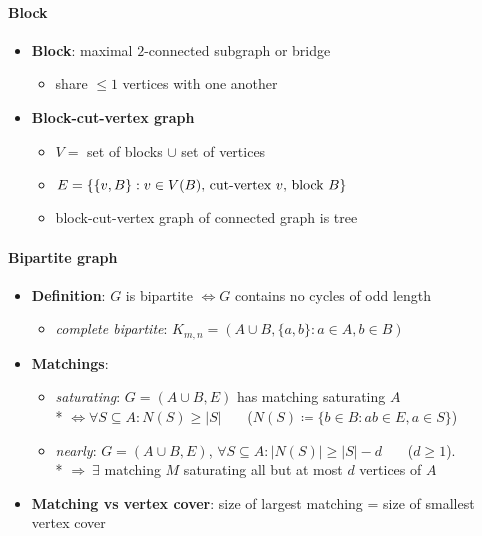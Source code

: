 \paragraph{Block}
\begin{itemize}
  \item \textbf{Block}: maximal $ 2 $-connected subgraph or bridge
  \begin{itemize}
     \item share $ \leq 1 $ vertices with one another 
   \end{itemize} 
   \item \textbf{Block-cut-vertex graph}
   \begin{itemize}
     \item $ V = $ set of blocks $ \cup $ set of vertices
     \item $ E = \{ \{ v,B \} : v \in V(B) \text{, cut-vertex $ v $, block $ B $} \} $ 
     \item block-cut-vertex graph of connected graph is tree
   \end{itemize}
\end{itemize}




\paragraph{Bipartite graph}
\begin{itemize}
  \item \textbf{Definition}: $ G $ is bipartite $ \Leftrightarrow G $ contains no cycles of odd length
  \begin{itemize}
    \item \emph{complete bipartite}: $ K_{m,n} = (A \cup B, \{ a,b \} : a \in A, b \in B) $ 
  \end{itemize}
  \item \textbf{Matchings}:
  \begin{itemize}
    \item \emph{saturating}: $ G = (A \cup B, E) $ has matching saturating $ A $ \\*
       $\Leftrightarrow \forall S \subseteq A : N(S) \geq \vert S \vert $ \ \ \ ($ N(S) \coloneqq \{ b \in B : ab \in E, a \in S \} $)
    \item \emph{nearly}: $ G = (A \cup B, E) $, $ \forall S \subseteq A : \vert N(S) \vert \geq \vert S \vert - d $ \ \ \  ($ d \geq 1 $). \\*
       $ \Rightarrow \ \exists $ matching $ M $ saturating all but at most $ d $ vertices of $ A $
  \end{itemize}
  \item \textbf{Matching vs vertex cover}: size of largest matching = size of smallest vertex cover
\end{itemize}

